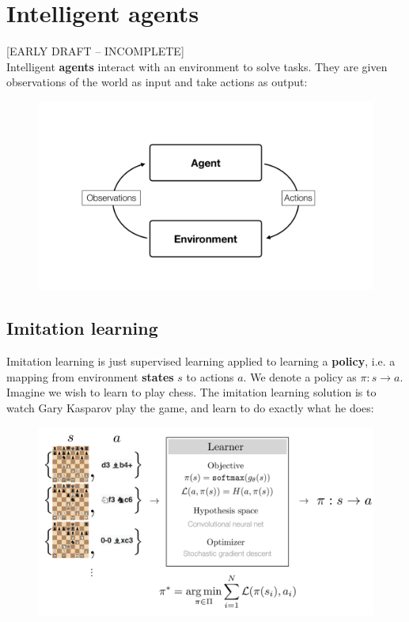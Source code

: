 
\setcounter{chapter}{34}
\chapter{Intelligent agents}

[EARLY DRAFT -- INCOMPLETE]
\\

Intelligent {\bf agents} interact with an environment to solve tasks. They are given observations of the world as input and take actions as output:
\begin{figure}[h]
    \centering
    \includegraphics[width=0.6\linewidth]{./figures/intelligent_agents/env_agent_loop.pdf}
    \label{fig:env_agent_loop}
\end{figure}


\section{Imitation learning}
Imitation learning is just supervised learning applied to learning a {\bf policy}, i.e. a mapping from environment {\bf states} $s$ to actions $a$. We denote a policy as $\pi: s \rightarrow a$. Imagine we wish to learn to play chess. The imitation learning solution is to watch Gary Kasparov play the game, and learn to do exactly what he does:
\begin{figure}[h]
    \centering
    \includegraphics[width=0.8\linewidth]{./figures/intelligent_agents/imitation_learning.pdf}
    \label{fig:intelligent_agents:imitation_learning}
\end{figure}
\newpage

